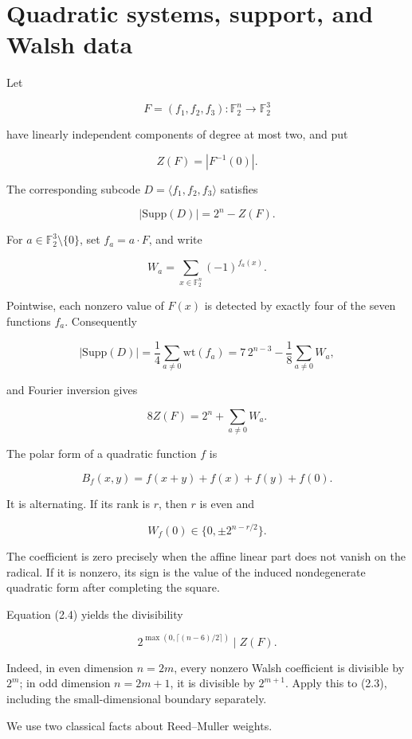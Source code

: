 \documentclass[11pt]{article}
\theoremstyle{remark}
\numberwithin{equation}{section}
\begin{document}
\section{Quadratic systems, support, and Walsh data}


Let

\[
F=(f_1,f_2,f_3):\mathbb F_2^n\longrightarrow\mathbb F_2^3
\]

have linearly independent components of degree at most two, and put

\[
Z(F)=|F^{-1}(0)|.
\]

The corresponding subcode \(D=\langle f_1,f_2,f_3\rangle\) satisfies

\[
|\mathrm{Supp}(D)|=2^n-Z(F).                    \tag{2.1}
\]

For \(a\in\mathbb F_2^3\setminus\{0\}\), set \(f_a=a\cdot F\), and write

\[
W_a=\sum_{x\in\mathbb F_2^n}(-1)^{f_a(x)}.
\]

Pointwise, each nonzero value of \(F(x)\) is detected by exactly four of the
seven functions \(f_a\). Consequently

\[
|\mathrm{Supp}(D)|
=\frac14\sum_{a\ne0}\mathrm{wt}(f_a)
=7\,2^{n-3}-\frac18\sum_{a\ne0}W_a,             \tag{2.2}
\]

and Fourier inversion gives

\[
8Z(F)=2^n+\sum_{a\ne0}W_a.                      \tag{2.3}
\]

The polar form of a quadratic function \(f\) is

\[
B_f(x,y)=f(x+y)+f(x)+f(y)+f(0).
\]

It is alternating. If its rank is \(r\), then \(r\) is even and

\[
W_f(0)\in\{0,\pm2^{n-r/2}\}.                    \tag{2.4}
\]

The coefficient is zero precisely when the affine linear part does not vanish
on the radical. If it is nonzero, its sign is the value of the induced
nondegenerate quadratic form after completing the square.

Equation (2.4) yields the divisibility

\[
2^{\max(0,\lceil(n-6)/2\rceil)}\mid Z(F).        \tag{2.5}
\]

Indeed, in even dimension \(n=2m\), every nonzero Walsh coefficient is divisible
by \(2^m\); in odd dimension \(n=2m+1\), it is divisible by \(2^{m+1}\). Apply
this to (2.3), including the small-dimensional boundary separately.

We use two classical facts about Reed--Muller weights.
\end{document}
